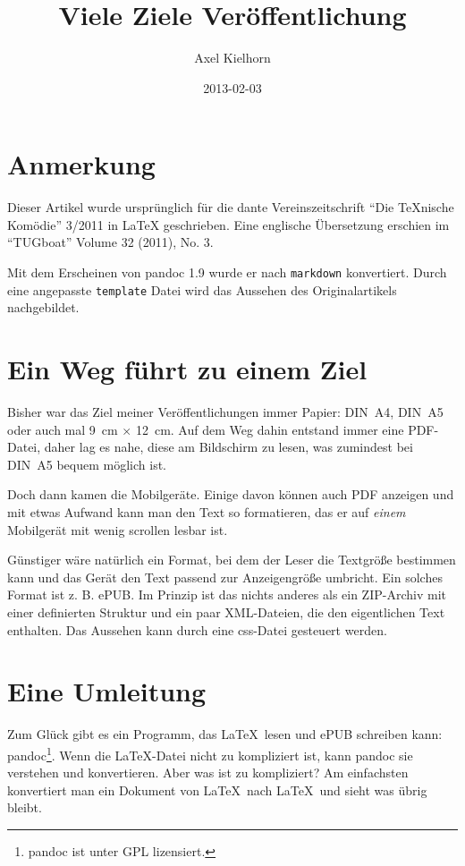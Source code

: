 \documentclass[11pt,ngerman,a4paper]{article}
\title{Viele Ziele Veröffentlichung}
\author{Axel Kielhorn}
\date{2013-02-03}
\begin{document}
\maketitle

\section{Anmerkung}

Dieser Artikel wurde ursprünglich für die dante Vereinszeitschrift
\enquote{Die TeXnische Komödie} 3/2011 in LaTeX geschrieben. Eine
englische Übersetzung erschien im \enquote{TUGboat} Volume 32 (2011),
No. 3.

Mit dem Erscheinen von pandoc 1.9 wurde er nach \texttt{markdown}
konvertiert. Durch eine angepasste \texttt{template} Datei wird das
Aussehen des Originalartikels nachgebildet.

\section{Ein Weg führt zu einem Ziel}

Bisher war das Ziel meiner Veröffentlichungen immer Papier: DIN~A4,
DIN~A5 oder auch mal 9~cm $\times$ 12~cm. Auf dem Weg dahin entstand
immer eine PDF-Datei, daher lag es nahe, diese am Bildschirm zu lesen,
was zumindest bei DIN~A5 bequem möglich ist.

Doch dann kamen die Mobilgeräte. Einige davon können auch PDF anzeigen
und mit etwas Aufwand kann man den Text so formatieren, das er auf
\emph{einem} Mobilgerät mit wenig scrollen lesbar ist.

Günstiger wäre natürlich ein Format, bei dem der Leser die Textgröße
bestimmen kann und das Gerät den Text passend zur Anzeigengröße
umbricht. Ein solches Format ist z. B. ePUB. Im Prinzip ist das nichts
anderes als ein ZIP-Archiv mit einer definierten Struktur und ein paar
XML-Dateien, die den eigentlichen Text enthalten. Das Aussehen kann
durch eine css-Datei gesteuert werden.

\section{Eine Umleitung}

Zum Glück gibt es ein Programm, das LaTeX~lesen und ePUB schreiben kann:
pandoc\autocite{pandoc}\footnote{pandoc ist unter GPL lizensiert.}. Wenn
die LaTeX-Datei nicht zu kompliziert ist, kann pandoc sie verstehen und
konvertieren. Aber was ist zu kompliziert? Am einfachsten konvertiert
man ein Dokument von LaTeX~nach LaTeX~und sieht was übrig bleibt.
\end{document}
